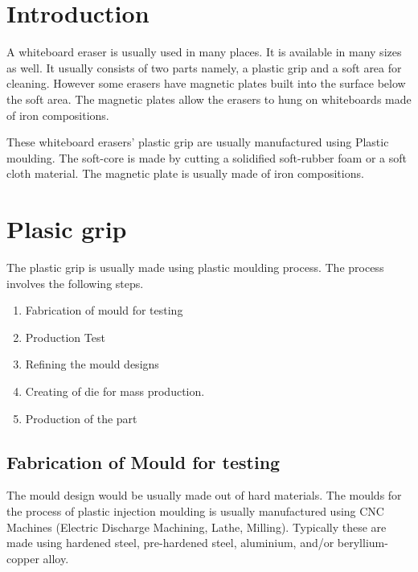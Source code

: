 \documentclass[12pt,a4paper,oneside]{article}
\begin{document}

\newpage
\tableofcontents

\newpage
{}
\setcounter{page}{1}


\section{Introduction}

A whiteboard eraser is usually used in many places. It is available in many sizes as well. It usually consists of two parts namely, a plastic grip and a soft area for cleaning. However some erasers have magnetic plates built into the surface below the soft area. The magnetic plates allow the erasers to hung on whiteboards made of iron compositions. 

These whiteboard erasers’ plastic grip are usually manufactured using Plastic moulding. The soft-core is made by cutting a solidified soft-rubber foam or a soft cloth material. The magnetic plate is usually made of iron compositions. 



\newpage
\section{Plasic grip}

The plastic grip is usually made using plastic moulding process. The process involves the following steps. 

\begin{enumerate}
    \item Fabrication of mould for testing
    \item Production Test
    \item Refining the mould designs
    \item Creating of die for mass production.
    \item Production of the part
\end{enumerate}


\subsection{Fabrication of Mould for testing}

The mould design would be usually made out of hard materials. The moulds for the process of plastic injection moulding is usually manufactured using CNC Machines (Electric Discharge Machining, Lathe, Milling). Typically these are made using hardened steel, pre-hardened steel, aluminium, and/or beryllium-copper alloy.
\end{document}
